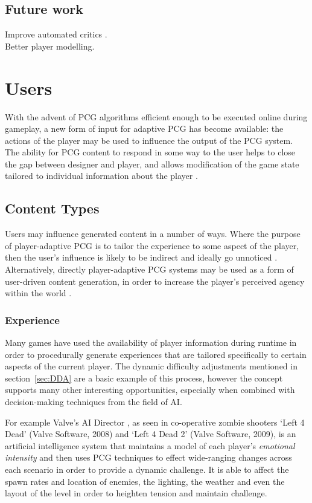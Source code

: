 \documentclass{acm_proc_article-sp}
\begin{document}
\subsection{Future work}
Improve automated critics \cite{hendrikx2012procedural}.\\
Better player modelling.

\newpage
\section{Users}
With the advent of PCG algorithms efficient enough to be executed online during gameplay, a new form of input for adaptive PCG has become available: the actions of the player may be used to influence the output of the PCG system.
The ability for PCG content to respond in some way to the user helps to close the gap between designer and player, and allows modification of the game state tailored to individual information about the player \cite{sorenson2010towards}.

\subsection{Content Types}
Users may influence generated content in a number of ways. Where the purpose of player-adaptive PCG is to tailor the experience to some aspect of the player, then the user's influence is likely to be indirect and ideally go unnoticed \cite{citeulike:7364450}. Alternatively, directly player-adaptive PCG systems may be used as a form of user-driven content generation, in order to increase the player's perceived agency within the world \cite{bartle2004designing}.

\subsubsection{Experience}
Many games have used the availability of player information during runtime in order to procedurally generate experiences that are tailored specifically to certain aspects of the current player. The dynamic difficulty adjustments mentioned in section~\ref{sec:DDA} are a basic example of this process, however the concept supports many other interesting opportunities, especially when combined with decision-making techniques from the field of AI. 

For example Valve's AI Director \cite{valve}, as seen in co-operative zombie shooters `Left 4 Dead' (Valve Software, 2008) and `Left 4 Dead 2' (Valve Software, 2009), is an artificial intelligence system that maintains a model of each player's \textit{emotional intensity} and then uses PCG techniques to effect wide-ranging changes across each scenario in order to provide a dynamic challenge. It is able to affect the spawn rates and location of enemies, the lighting, the weather and even the layout of the level in order to heighten tension and maintain challenge.
\end{document}
